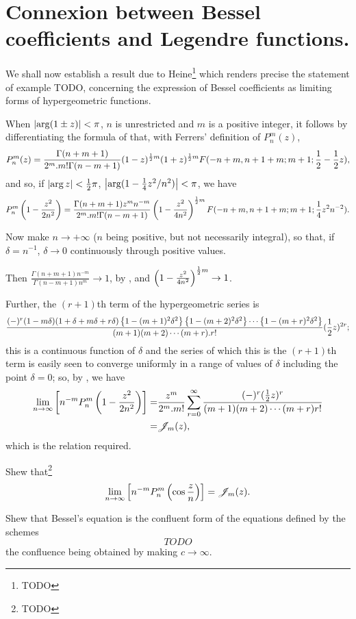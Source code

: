 \documentclass{book}
\begin{document}
\section{Connexion between Bessel coefficients and Legendre
  functions.}
We shall now establish a result due to Heine\footnote{TODO} which
renders precise the statement of  example
TODO, concerning the expression of Bessel coefficients as limiting
forms of hypergeometric functions.

When $\left| \arg(1\pm z) \right| < \pi$, $n$ is unrestricted and $m$ is a
positive integer, it follows by differentiating the formula of
 that, with Ferrers' definition of
$P_n^{m}(z)$,
$$
P_n^{m}(z)
=
\frac{\Gamma(n+m+1)}{2^m . m! \Gamma(n-m+1)}
(1-z)^{\frac{1}{2} m}
(1+z)^{\frac{1}{2} m}
F(-n+m,n+1+m; m+1; \frac{1}{2} - \frac{1}{2} z),
$$
and so, if $\left| \arg z \right| < \frac{1}{2}\pi$,
$\left| \arg (1 - \frac{1}{4} z^2/n^2) \right| < \pi$, we have
$$
P_n^{m}\left( 1 - \frac{z^2}{2n^2} \right)
=
\frac{\Gamma(n+m+1) z^m n^{-m}}{2^m . m! \Gamma(n-m+1)}
\left( 1 - \frac{z^2}{4n^2} \right)^{\frac{1}{2} m}
F(-n+m,n+1+m;m+1; \frac{1}{4} z^2 n^{-2}).
$$

Now make $n \rightarrow +\infty$ ($n$ being positive, but not
necessarily integral), so that, if $\delta = n^{-1}$, 
$\delta \rightarrow 0$ continuously through positive values.

Then
$ \frac{\Gamma(n+m+1)n^{-m}}{\Gamma(n-m+1) n^m} \rightarrow 1$,
by , and
$ \left( 1 - \frac{z^2}{4n^2} \right)^{\frac{1}{2} m} \rightarrow 1$.

Further, the $(r+1)$th term of the hypergeometric series is
$$
\frac{
  (-)^r
  (1-m\delta)
  (1+\delta+m\delta+r\delta)
  \left\{  1 - (m+1)^2 \delta^2  \right\}
  \left\{  1 - (m+2)^2 \delta^2  \right\}
  \cdots
  \left\{  1 - (m+r)^2 \delta^2  \right\}
}{ (m+1)(m+2)\cdots(m+r).r!}
(\frac{1}{2} z)^{2r};
$$
this is a continuous function of $\delta$ and the series of which this
is the $(r+1)$th term is easily seen to converge uniformly in a range
of values of $\delta$ including the point $\delta=0$; so, by
, we have
\begin{align*}
  \lim_{n \rightarrow \infty}
  \left[  n^{-m} P_n^{m}\left( 1 - \frac{z^2}{2n^2} \right) \right]
  =& \frac{z^m}{2^m.m!}
  \sum_{r=0}^{\infty} \frac{(-)^r (\frac{1}{2}
    z)^r}{(m+1)(m+2)\cdots(m+r)r!} \\
  =& \mathscr{J}_m(z),
\end{align*}
which is the relation required.
\begin{wandwexample}
  Shew that\footnote{TODO}
  $$
  \lim_{n\rightarrow\infty}
  \left[  n^{-m} P_n^{m}\left( \cos \frac{z}{n} \right) \right] = \mathscr{J}_m(z).
  $$
\end{wandwexample}
% 
% 
\begin{wandwexample}
  Shew that Bessel's equation is the confluent form of the equations
  defined by the schemes
  $$
  TODO
  $$
  the confluence being obtained by making $c \rightarrow \infty$.
\end{wandwexample}
\end{document}
